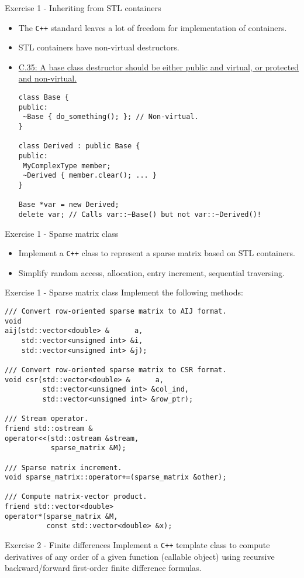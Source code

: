 \documentclass[10pt]{beamer}
\begin{document}
\begin{frame}[fragile]{Exercise 1 - Inheriting from STL containers}
\begin{itemize}
\item The \texttt{C++} standard leaves a lot of freedom for implementation of containers.
\item STL containers have non-virtual destructors.
\item \href{http://isocpp.github.io/CppCoreGuidelines/CppCoreGuidelines\#Rc-dtor-virtual}{C.35: A base class destructor should be either public and virtual, or protected and non-virtual.}
\small\begin{lstlisting}
class Base {
public:
 ~Base { do_something(); }; // Non-virtual.
}

class Derived : public Base {
public:
 MyComplexType member;
 ~Derived { member.clear(); ... }
}

Base *var = new Derived;
delete var; // Calls var::~Base() but not var::~Derived()!
\end{lstlisting}\normalsize
\end{itemize}
\end{frame}


\begin{frame}[fragile]{Exercise 1 - Sparse matrix class}
\begin{itemize}
\item Implement a \texttt{C++} class to represent a sparse matrix based on STL containers.
\item Simplify random access, allocation, entry increment, sequential traversing.
\end{itemize}
\end{frame}


\begin{frame}[fragile]{Exercise 1 - Sparse matrix class}
Implement the following methods:
\begin{lstlisting}[basicstyle=\footnotesize]
/// Convert row-oriented sparse matrix to AIJ format.
void
aij(std::vector<double> &      a,
    std::vector<unsigned int> &i,
    std::vector<unsigned int> &j);

/// Convert row-oriented sparse matrix to CSR format.
void csr(std::vector<double> &      a,
         std::vector<unsigned int> &col_ind,
         std::vector<unsigned int> &row_ptr);

/// Stream operator.
friend std::ostream &
operator<<(std::ostream &stream,
           sparse_matrix &M);

/// Sparse matrix increment.
void sparse_matrix::operator+=(sparse_matrix &other);

/// Compute matrix-vector product.
friend std::vector<double>
operator*(sparse_matrix &M,
          const std::vector<double> &x);
\end{lstlisting}
\end{frame}

\begin{frame}[fragile]{Exercise 2 - Finite differences}
Implement a \texttt{C++} template class to compute derivatives of any order of a given function (callable object) using recursive backward/forward first-order finite difference formulas.
\end{frame}
\end{document}
